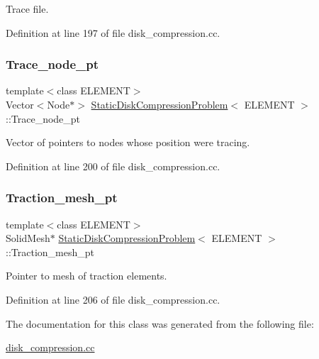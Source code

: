 Trace file. 



Definition at line 197 of file disk\+\_\+compression.\+cc.

\mbox{\label{classStaticDiskCompressionProblem_a8e98a225a1bb49cb6943b59d9f3145dc}} 
\subsubsection{\texorpdfstring{Trace\+\_\+node\+\_\+pt}{Trace\_node\_pt}}
{\footnotesize\ttfamily template$<$class E\+L\+E\+M\+E\+NT$>$ \\
Vector$<$Node$\ast$$>$ \hyperlink{classStaticDiskCompressionProblem}{Static\+Disk\+Compression\+Problem}$<$ E\+L\+E\+M\+E\+NT $>$\+::Trace\+\_\+node\+\_\+pt\hspace{0.3cm}{\ttfamily [private]}}



Vector of pointers to nodes whose position we\textquotesingle{}re tracing. 



Definition at line 200 of file disk\+\_\+compression.\+cc.

\mbox{\label{classStaticDiskCompressionProblem_a66623722b4cb3bdc94d46a56c18d2908}} 
\subsubsection{\texorpdfstring{Traction\+\_\+mesh\+\_\+pt}{Traction\_mesh\_pt}}
{\footnotesize\ttfamily template$<$class E\+L\+E\+M\+E\+NT$>$ \\
Solid\+Mesh$\ast$ \hyperlink{classStaticDiskCompressionProblem}{Static\+Disk\+Compression\+Problem}$<$ E\+L\+E\+M\+E\+NT $>$\+::Traction\+\_\+mesh\+\_\+pt\hspace{0.3cm}{\ttfamily [private]}}



Pointer to mesh of traction elements. 



Definition at line 206 of file disk\+\_\+compression.\+cc.



The documentation for this class was generated from the following file\+:\begin{DoxyCompactItemize}
\item 
\hyperlink{disk__compression_8cc}{disk\+\_\+compression.\+cc}\end{DoxyCompactItemize}
